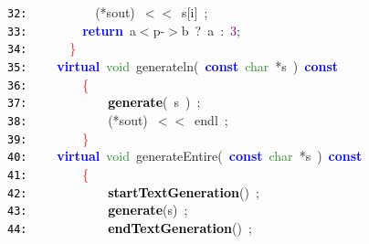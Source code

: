 \documentclass{article}
\begin{document}
\mbox{}\texttt{\textcolor{Black}{32:}} \ \ \ \ \ \ \ \ \ \ \textcolor{BrickRed}{(*}sout\textcolor{BrickRed}{)}\ \textcolor{BrickRed}{$<$$<$}\ s\textcolor{BrickRed}{[}i\textcolor{BrickRed}{]}\ \textcolor{BrickRed}{;} \\
\mbox{}\texttt{\textcolor{Black}{33:}} \ \ \ \ \ \ \ \ \textbf{\textcolor{Blue}{return}}\ a\textcolor{BrickRed}{$<$}p\textcolor{BrickRed}{-$>$}b\ \textcolor{BrickRed}{?}\ a\ \textcolor{BrickRed}{:}\ \textcolor{Purple}{3}\textcolor{BrickRed}{;} \\
\mbox{}\texttt{\textcolor{Black}{34:}} \ \ \ \ \ \ \textcolor{Red}{\}} \\
\mbox{}\texttt{\textcolor{Black}{35:}} \ \ \ \ \textbf{\textcolor{Blue}{virtual}}\ \textcolor{ForestGreen}{void}\ \label{test.h:35}generateln\textcolor{BrickRed}{(}\ \textbf{\textcolor{Blue}{const}}\ \textcolor{ForestGreen}{char}\ \textcolor{BrickRed}{*}s\ \textcolor{BrickRed}{)}\ \textbf{\textcolor{Blue}{const}} \\
\mbox{}\texttt{\textcolor{Black}{36:}} \ \ \ \ \ \ \ \ \textcolor{Red}{\{}\  \\
\mbox{}\texttt{\textcolor{Black}{37:}} \ \ \ \ \ \ \ \ \ \ \ \ \textbf{\textcolor{Black}{generate}}\textcolor{BrickRed}{(}\ s\ \textcolor{BrickRed}{)}\ \textcolor{BrickRed}{;} \\
\mbox{}\texttt{\textcolor{Black}{38:}} \ \ \ \ \ \ \ \ \ \ \ \ \textcolor{BrickRed}{(*}sout\textcolor{BrickRed}{)}\ \textcolor{BrickRed}{$<$$<$}\ endl\ \textcolor{BrickRed}{;}\  \\
\mbox{}\texttt{\textcolor{Black}{39:}} \ \ \ \ \ \ \ \ \textcolor{Red}{\}} \\
\mbox{}\texttt{\textcolor{Black}{40:}} \ \ \ \ \textbf{\textcolor{Blue}{virtual}}\ \textcolor{ForestGreen}{void}\ \label{test.h:40}generateEntire\textcolor{BrickRed}{(}\ \textbf{\textcolor{Blue}{const}}\ \textcolor{ForestGreen}{char}\ \textcolor{BrickRed}{*}s\ \textcolor{BrickRed}{)}\ \textbf{\textcolor{Blue}{const}} \\
\mbox{}\texttt{\textcolor{Black}{41:}} \ \ \ \ \ \ \ \ \textcolor{Red}{\{} \\
\mbox{}\texttt{\textcolor{Black}{42:}} \ \ \ \ \ \ \ \ \ \ \ \ \textbf{\textcolor{Black}{startTextGeneration}}\textcolor{BrickRed}{()}\ \textcolor{BrickRed}{;} \\
\mbox{}\texttt{\textcolor{Black}{43:}} \ \ \ \ \ \ \ \ \ \ \ \ \textbf{\textcolor{Black}{generate}}\textcolor{BrickRed}{(}s\textcolor{BrickRed}{)}\ \textcolor{BrickRed}{;} \\
\mbox{}\texttt{\textcolor{Black}{44:}} \ \ \ \ \ \ \ \ \ \ \ \ \textbf{\textcolor{Black}{endTextGeneration}}\textcolor{BrickRed}{()}\ \textcolor{BrickRed}{;} \\
\end{document}
